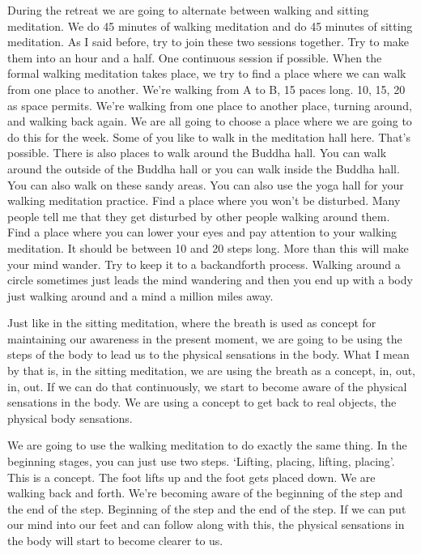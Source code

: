 \documentclass[letterpaper,10pt,english]{sphinxmanual}
\begin{document}
\sphinxAtStartPar
During the retreat we are going to alternate between walking and sitting meditation. We do 45 minutes of walking meditation and do 45 minutes
of sitting meditation. As I said before, try to join these two sessions together.
Try to make them into an hour and a half. One continuous session if possible.
When the formal walking meditation takes place, we try to find a place
where we can walk from one place to another. We’re walking from A to B,
15 paces long. 10, 15, 20 as space permits. We’re walking from one place
to another place, turning around, and walking back again. We are all going
to choose a place where we are going to do this for the week. Some of you
like to walk in the meditation hall here. That’s possible. There is also places
to  walk  around  the  Buddha  hall. You  can  walk  around  the  outside  of  the
Buddha hall or you can walk inside the Buddha hall. You can also walk on
these sandy areas. You can also use the yoga hall for your walking meditation practice. Find a place where you won’t be disturbed. Many people tell
  me  that  they  get  disturbed  by  other  people  walking  around  them.  Find  a
place  where  you  can  lower  your  eyes  and  pay  attention  to  your  walking
meditation. It should be between 10 and 20 steps long. More than this will
make your mind wander. Try to keep it to a back\sphinxhyphen{}and\sphinxhyphen{}forth process. Walking
around a circle sometimes just leads the mind wandering and then you end
up with a body just walking around and a mind a million miles away.

\sphinxAtStartPar
Just like in the sitting meditation, where the breath is used as concept
for  maintaining  our  awareness  in  the  present  moment,  we  are  going  to  be
using the steps of the body to lead us to the physical sensations in the body.
What I mean by that is, in the sitting meditation, we are using the breath as
a concept, in, out, in, out. If we can do that continuously, we start to become
aware of the physical sensations in the body. We are using a concept to get
back to real objects, the physical body sensations.

\sphinxAtStartPar
We  are  going  to  use  the  walking  meditation  to  do  exactly  the  same
thing. In the beginning stages, you can just use two steps. ‘Lifting, placing,
lifting, placing’. This is a concept. The foot lifts up and the foot gets placed
down. We are walking back and forth. We’re becoming aware of the beginning of the step and the end of the step. Beginning of the step and the end of
the step. If we can put our mind into our feet and can follow along with this,
the physical sensations in the body will start to become clearer to us.
\end{document}
